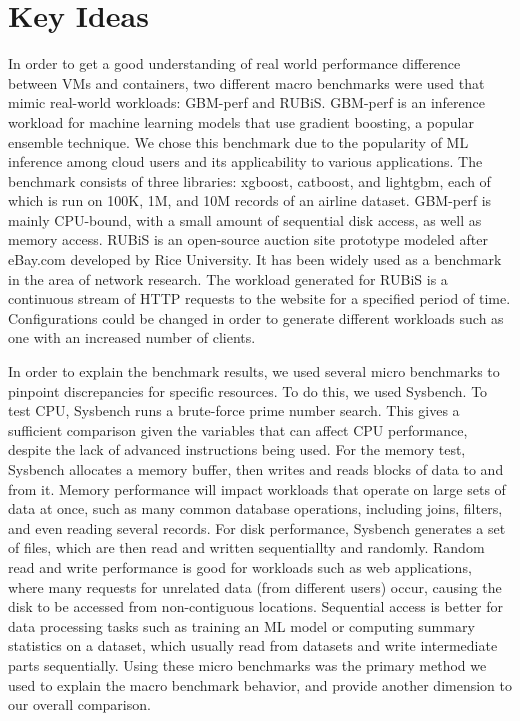 \documentclass[11pt]{article}
\begin{document}
\vspace{3mm} %


\section{Key Ideas}

In order to get a good understanding of real world performance difference between VMs and containers, two different macro benchmarks were used that mimic real-world workloads: GBM-perf and RUBiS. GBM-perf is an inference workload for machine learning models that use gradient boosting, a popular ensemble technique. We chose this benchmark due to the popularity of ML inference among cloud users and its applicability to various applications. The benchmark consists of three libraries: xgboost, catboost, and lightgbm, each of which is run on 100K, 1M, and 10M records of an airline dataset. GBM-perf is mainly CPU-bound, with a small amount of sequential disk access, as well as memory access. RUBiS is an open-source auction site prototype modeled after eBay.com developed by Rice University. It has been widely used as a benchmark in the area of network research. The workload generated for RUBiS is a continuous stream of HTTP requests to the website for a specified period of time. Configurations could be changed in order to generate different workloads such as one with an increased number of clients.

In order to explain the benchmark results, we used several micro benchmarks to pinpoint discrepancies for specific resources. To do this, we used Sysbench. To test CPU, Sysbench runs a brute-force prime number search. This gives a sufficient comparison given the variables that can affect CPU performance, despite the lack of advanced instructions being used. For the memory test, Sysbench allocates a memory buffer, then writes and reads blocks of data to and from it. Memory performance will impact workloads that operate on large sets of data at once, such as many common database operations, including joins, filters, and even reading several records. For disk performance, Sysbench generates a set of files, which are then read and written sequentiallty and randomly. Random read and write performance is good for workloads such as web applications, where many requests for unrelated data (from different users) occur, causing the disk to be accessed from non-contiguous locations. Sequential access is better for data processing tasks such as training an ML model or computing summary statistics on a dataset, which usually read from datasets and write intermediate parts sequentially. Using these micro benchmarks was the primary method we used to explain the macro benchmark behavior, and provide another dimension to our overall comparison.
\end{document}
